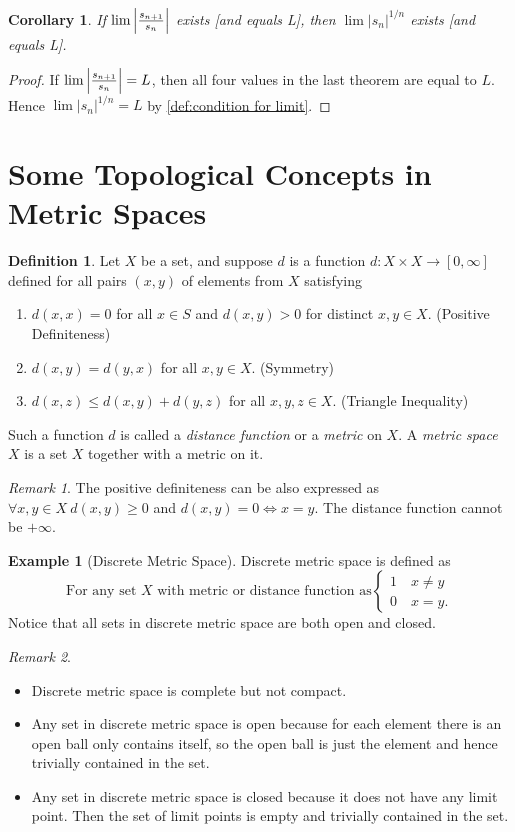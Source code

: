 \documentclass[12pt, lettersize]{book}
\theoremstyle{plain}
\newtheorem{cor}{Corollary}[thm]
\theoremstyle{definition}
\newtheorem{dfn}[thm]{Definition}
\newtheorem*{eg}{Example}
\theoremstyle{remark}
\newtheorem*{rem}{Remark}
\begin{document}
		\begin{cor}\label{def:12.3}
		If $\lim\abs{\frac{s_{n+1}}{s_n}}$ exists [and equals L], then $\lim|s_n|^{1/n}$ exists [and equals L].
		\end{cor}
		\begin{proof}
		If $\lim\abs{\frac{s_{n+1}}{s_n}}=L$, then all four values in the last theorem are equal to $L$. Hence
		$\lim|s_n|^{1/n}=L$ by \ref{def:condition for limit}.
		\end{proof}
		\newpage
	\section{Some Topological Concepts in Metric Spaces}
		\begin{dfn}
			Let $X$ be a set, and suppose $d$ is a function $d: X\times X\rightarrow[0,\infty]$ defined for all pairs $(x,y)$ of elements from $X$ satisfying
			\begin{enumerate}
				\item $d(x,x)=0$ for all $x\in S$ and $d(x,y)>0$ for distinct $x,y\in X$. (Positive Definiteness)
				\item $d(x,y)=d(y,x)$ for all $x,y\in X$. (Symmetry)
				\item $d(x,z)\leq d(x,y)+d(y,z)$ for all $x,y,z\in X$. (Triangle Inequality)
			\end{enumerate}
			Such a function $d$ is called a \emph{distance function} or a \emph{metric} on $X$. A \emph{metric space} $X$ is a set $X$ together with a metric on it.
		\end{dfn}
		\begin{rem}
			The positive definiteness can be also expressed as $\forall x,y\in X\ d(x,y)\geq 0$ and $d(x,y)=0\iff x=y$. The distance function cannot be $+\infty$.
		\end{rem}
		\begin{eg}[Discrete Metric Space]
			Discrete metric space is defined as
			\begin{displaymath}
				\text{For any set $X$ with metric or distance function as}\begin{cases}
					1\quad\text{$x\neq y$}\\ 0\quad\text{$x=y$}.
				\end{cases}
			\end{displaymath}
			Notice that all sets in discrete metric space are both open and closed.
		\end{eg}
		\begin{rem}
			\begin{itemize}
				\item Discrete metric space is complete but not compact.
				\item Any set in discrete metric space is open because for each element there is an open ball only contains itself, so the open ball is just the element and hence trivially contained in the set.
				\item Any set in discrete metric space is closed because it does not have any limit point. Then the set of limit points is empty and trivially contained in the set.
			\end{itemize}
		\end{rem}
		
\end{document}
